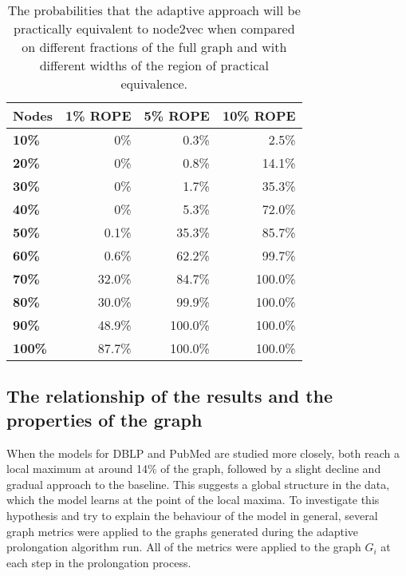 \begin{table}
  \caption{The probabilities that the adaptive approach will be practically equivalent to node2vec when compared on different fractions of the full graph and with different widths of the region of practical equivalence.}
  \label{tab:bayesian-adaptive}
  \centering
  \begin{tabular}{lrrr}
    \toprule
    \textbf{Nodes} & \textbf{1\% ROPE} & \textbf{5\% ROPE} & \textbf{10\% ROPE} \\
    \midrule
    \textbf{10\%}  & 0\%               & 0.3\%             & 2.5\%              \\
    \textbf{20\%}  & 0\%               & 0.8\%             & 14.1\%             \\
    \textbf{30\%}  & 0\%               & 1.7\%             & 35.3\%             \\
    \textbf{40\%}  & 0\%               & 5.3\%             & 72.0\%             \\
    \textbf{50\%}  & 0.1\%             & 35.3\%            & 85.7\%             \\
    \textbf{60\%}  & 0.6\%             & 62.2\%            & 99.7\%             \\
    \textbf{70\%}  & 32.0\%            & 84.7\%            & 100.0\%            \\
    \textbf{80\%}  & 30.0\%            & 99.9\%            & 100.0\%            \\
    \textbf{90\%}  & 48.9\%            & 100.0\%           & 100.0\%            \\
    \textbf{100\%} & 87.7\%            & 100.0\%           & 100.0\%            \\
    \bottomrule
  \end{tabular}
\end{table}

\subsection{The relationship of the results and the properties of the graph}

When the models for DBLP and PubMed are studied more closely, both reach a local maximum at around 14\% of the graph, followed by a slight decline and gradual approach to the baseline. This suggests a global structure in the data, which the model learns at the point of the local maxima. To investigate this hypothesis and try to explain the behaviour of the model in general, several graph metrics were applied to the graphs generated during the adaptive prolongation algorithm run. All of the metrics were applied to the graph \( G_i \) at each step in the prolongation process.

